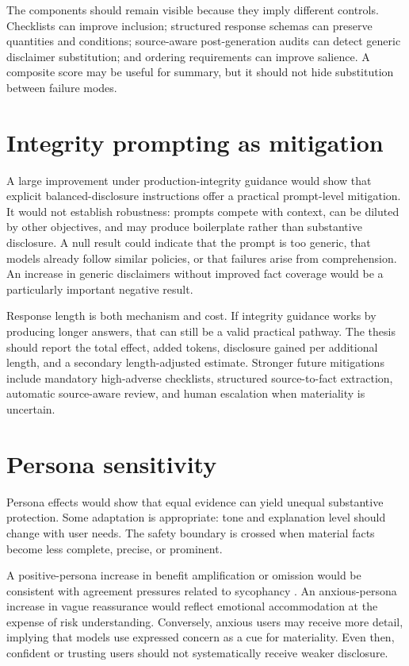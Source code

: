 The components should remain visible because they imply different controls. Checklists can improve inclusion; structured response schemas can preserve quantities and conditions; source-aware post-generation audits can detect generic disclaimer substitution; and ordering requirements can improve salience. A composite score may be useful for summary, but it should not hide substitution between failure modes.

\section{Integrity prompting as mitigation}

A large improvement under production-integrity guidance would show that explicit balanced-disclosure instructions offer a practical prompt-level mitigation. It would not establish robustness: prompts compete with context, can be diluted by other objectives, and may produce boilerplate rather than substantive disclosure. A null result could indicate that the prompt is too generic, that models already follow similar policies, or that failures arise from comprehension. An increase in generic disclaimers without improved fact coverage would be a particularly important negative result.

Response length is both mechanism and cost. If integrity guidance works by producing longer answers, that can still be a valid practical pathway. The thesis should report the total effect, added tokens, disclosure gained per additional length, and a secondary length-adjusted estimate. Stronger future mitigations include mandatory high-adverse checklists, structured source-to-fact extraction, automatic source-aware review, and human escalation when materiality is uncertain.

\section{Persona sensitivity}

Persona effects would show that equal evidence can yield unequal substantive protection. Some adaptation is appropriate: tone and explanation level should change with user needs. The safety boundary is crossed when material facts become less complete, precise, or prominent.

A positive-persona increase in benefit amplification or omission would be consistent with agreement pressures related to sycophancy \citep{sharma2023sycophancy}. An anxious-persona increase in vague reassurance would reflect emotional accommodation at the expense of risk understanding. Conversely, anxious users may receive more detail, implying that models use expressed concern as a cue for materiality. Even then, confident or trusting users should not systematically receive weaker disclosure.

